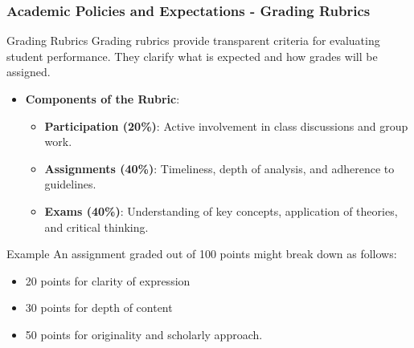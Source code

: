 \documentclass[aspectratio=169]{beamer}
\begin{document}
\begin{frame}[fragile]
    \frametitle{Academic Policies and Expectations - Grading Rubrics}
    \begin{block}{Grading Rubrics}
        Grading rubrics provide transparent criteria for evaluating student performance. They clarify what is expected and how grades will be assigned.
    \end{block}
    \begin{itemize}
        \item \textbf{Components of the Rubric}:
        \begin{itemize}
            \item \textbf{Participation (20\%)}: Active involvement in class discussions and group work.
            \item \textbf{Assignments (40\%)}: Timeliness, depth of analysis, and adherence to guidelines.
            \item \textbf{Exams (40\%)}: Understanding of key concepts, application of theories, and critical thinking.
        \end{itemize}
    \end{itemize}
    \begin{block}{Example}
        An assignment graded out of 100 points might break down as follows:
        \begin{itemize}
            \item 20 points for clarity of expression
            \item 30 points for depth of content
            \item 50 points for originality and scholarly approach.
        \end{itemize}
    \end{block}
\end{frame}
\end{document}
